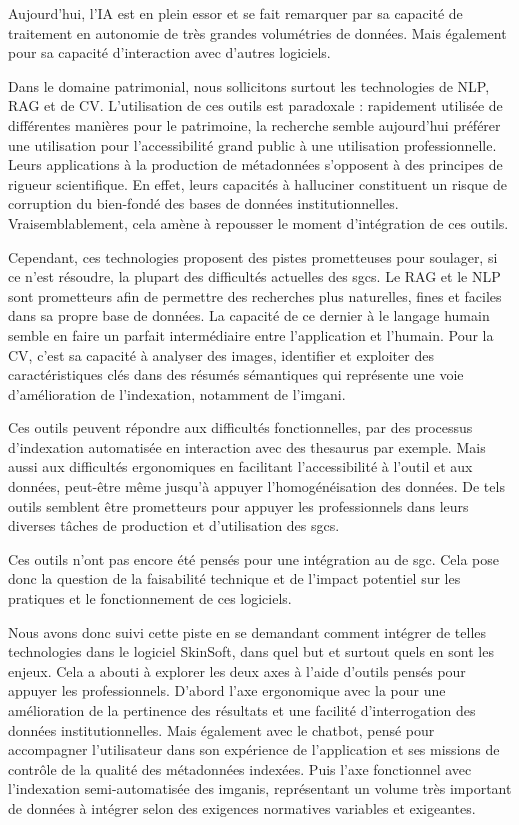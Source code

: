 Aujourd'hui, l'\gls{IA} est en plein essor et se fait remarquer par sa capacité de traitement en autonomie de très grandes volumétries de données. Mais également pour sa capacité d’interaction avec d'autres logiciels. 

Dans le domaine patrimonial, nous sollicitons surtout les technologies de \gls{NLP}, \gls{RAG} et de \gls{CV}. L'utilisation de ces outils est paradoxale : rapidement utilisée de différentes manières pour le patrimoine, la recherche semble aujourd'hui préférer une utilisation pour l'accessibilité grand public à une utilisation professionnelle. Leurs applications à la production de métadonnées s'opposent à des principes de rigueur scientifique. En effet, leurs capacités à halluciner constituent un risque de corruption du bien-fondé des bases de données institutionnelles. Vraisemblablement, cela amène à repousser le moment d'intégration de ces outils.

Cependant, ces technologies proposent des pistes prometteuses pour soulager, si ce n'est résoudre, la plupart des difficultés actuelles des \glspl{sgc}. Le \gls{RAG} et le \gls{NLP} sont prometteurs afin de permettre des recherches plus naturelles, fines et faciles dans sa propre base de données. La capacité de ce dernier à  le langage humain semble en faire un parfait intermédiaire entre l'application et l'humain. Pour la \gls{CV}, c'est sa capacité à analyser des images, identifier et exploiter des caractéristiques clés dans des résumés sémantiques qui représente une voie d'amélioration de l'indexation, notamment de l'\gls{imgani}. 

Ces outils peuvent répondre aux difficultés fonctionnelles, par des processus d'indexation automatisée en interaction avec des \gls{thesaurus} par exemple. Mais aussi aux difficultés ergonomiques en facilitant l'accessibilité à l'outil et aux données, peut-être même jusqu'à appuyer l'homogénéisation des données. De tels outils semblent être prometteurs pour appuyer les professionnels dans leurs diverses tâches de production et d'utilisation des \glspl{sgc}. \newline

Ces outils n'ont pas encore été pensés pour une intégration au \coeur de \gls{sgc}. Cela pose donc la question de la faisabilité technique et de l'impact potentiel sur les pratiques et le fonctionnement de ces logiciels. 

Nous avons donc suivi cette piste en se demandant comment intégrer de telles technologies dans le logiciel SkinSoft, dans quel but et surtout quels en sont les enjeux. Cela a abouti à explorer les deux axes à l'aide d'outils pensés pour appuyer les professionnels. D'abord l'axe ergonomique avec la  pour une amélioration de la pertinence des résultats et une facilité d'interrogation des données institutionnelles. Mais également avec le \gls{chatbot}, pensé pour accompagner l'utilisateur dans son expérience de l'application et ses missions de contrôle de la qualité des métadonnées indexées. Puis l'axe fonctionnel avec l'indexation semi-automatisée des \glspl{imgani}, représentant un volume très important de données à intégrer selon des exigences normatives variables et exigeantes. 

